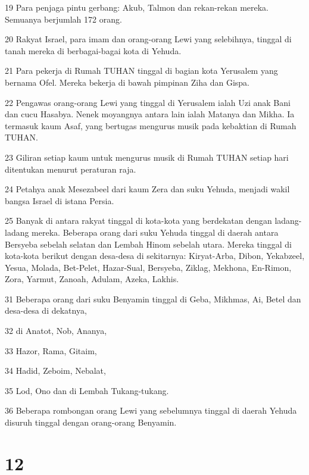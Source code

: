 \par 19 Para penjaga pintu gerbang: Akub, Talmon dan rekan-rekan mereka. Semuanya berjumlah 172 orang.
\par 20 Rakyat Israel, para imam dan orang-orang Lewi yang selebihnya, tinggal di tanah mereka di berbagai-bagai kota di Yehuda.
\par 21 Para pekerja di Rumah TUHAN tinggal di bagian kota Yerusalem yang bernama Ofel. Mereka bekerja di bawah pimpinan Ziha dan Gispa.
\par 22 Pengawas orang-orang Lewi yang tinggal di Yerusalem ialah Uzi anak Bani dan cucu Hasabya. Nenek moyangnya antara lain ialah Matanya dan Mikha. Ia termasuk kaum Asaf, yang bertugas mengurus musik pada kebaktian di Rumah TUHAN.
\par 23 Giliran setiap kaum untuk mengurus musik di Rumah TUHAN setiap hari ditentukan menurut peraturan raja.
\par 24 Petahya anak Mesezabeel dari kaum Zera dan suku Yehuda, menjadi wakil bangsa Israel di istana Persia.
\par 25 Banyak di antara rakyat tinggal di kota-kota yang berdekatan dengan ladang-ladang mereka. Beberapa orang dari suku Yehuda tinggal di daerah antara Bersyeba sebelah selatan dan Lembah Hinom sebelah utara. Mereka tinggal di kota-kota berikut dengan desa-desa di sekitarnya: Kiryat-Arba, Dibon, Yekabzeel, Yesua, Molada, Bet-Pelet, Hazar-Sual, Bersyeba, Ziklag, Mekhona, En-Rimon, Zora, Yarmut, Zanoah, Adulam, Azeka, Lakhis.
\par 31 Beberapa orang dari suku Benyamin tinggal di Geba, Mikhmas, Ai, Betel dan desa-desa di dekatnya,
\par 32 di Anatot, Nob, Ananya,
\par 33 Hazor, Rama, Gitaim,
\par 34 Hadid, Zeboim, Nebalat,
\par 35 Lod, Ono dan di Lembah Tukang-tukang.
\par 36 Beberapa rombongan orang Lewi yang sebelumnya tinggal di daerah Yehuda disuruh tinggal dengan orang-orang Benyamin.

\chapter{12}

